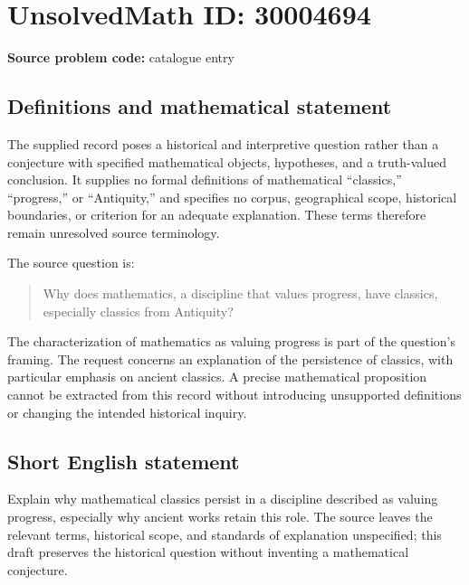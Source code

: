 \documentclass[11pt]{article}
\begin{document}
\section*{UnsolvedMath ID: 30004694}
\textbf{Source problem code:} catalogue entry
\subsection{Definitions and mathematical statement}
The supplied record poses a historical and interpretive question rather than a conjecture with specified mathematical objects, hypotheses, and a truth-valued conclusion. It supplies no formal definitions of mathematical ``classics,'' ``progress,'' or ``Antiquity,'' and specifies no corpus, geographical scope, historical boundaries, or criterion for an adequate explanation. These terms therefore remain unresolved source terminology.

The source question is:
\begin{quote}
Why does mathematics, a discipline that values progress, have classics, especially classics from Antiquity?
\end{quote}
The characterization of mathematics as valuing progress is part of the question's framing. The request concerns an explanation of the persistence of classics, with particular emphasis on ancient classics. A precise mathematical proposition cannot be extracted from this record without introducing unsupported definitions or changing the intended historical inquiry.
\subsection{Short English statement}
Explain why mathematical classics persist in a discipline described as valuing progress, especially why ancient works retain this role. The source leaves the relevant terms, historical scope, and standards of explanation unspecified; this draft preserves the historical question without inventing a mathematical conjecture.
\end{document}
